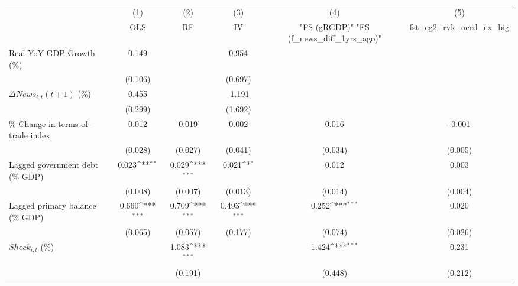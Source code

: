{
\def\sym#1{\ifmmode^{#1}\else\(^{#1}\)\fi}
\begin{tabular}{l*{5}{c}}
\toprule
                    &\multicolumn{1}{c}{(1)}&\multicolumn{1}{c}{(2)}&\multicolumn{1}{c}{(3)}&\multicolumn{1}{c}{(4)}&\multicolumn{1}{c}{(5)}\\
                    &\multicolumn{1}{c}{OLS}&\multicolumn{1}{c}{RF}&\multicolumn{1}{c}{IV}&\multicolumn{1}{c}{ "FS (gRGDP)"  "FS (f_news_diff_1yrs_ago)" }&\multicolumn{1}{c}{fst_eg2_rvk_oecd_ex_big}\\
\midrule
Real YoY GDP Growth (\%)&       0.149         &                     &       0.954         &                     &                     \\
                    &     (0.106)         &                     &     (0.697)         &                     &                     \\
\addlinespace
$ \Delta News_{i,t}(t+1)$ (\%)&       0.455         &                     &      -1.191         &                     &                     \\
                    &     (0.299)         &                     &     (1.692)         &                     &                     \\
\addlinespace
\% Change in terms-of-trade index&       0.012         &       0.019         &       0.002         &       0.016         &      -0.001         \\
                    &     (0.028)         &     (0.027)         &     (0.041)         &     (0.034)         &     (0.005)         \\
\addlinespace
Lagged government debt (\% GDP)&       0.023\sym{**} &       0.029\sym{***}&       0.021\sym{*}  &       0.012         &       0.003         \\
                    &     (0.008)         &     (0.007)         &     (0.013)         &     (0.014)         &     (0.004)         \\
\addlinespace
Lagged primary balance (\% GDP)&       0.660\sym{***}&       0.709\sym{***}&       0.493\sym{***}&       0.252\sym{***}&       0.020         \\
                    &     (0.065)         &     (0.057)         &     (0.177)         &     (0.074)         &     (0.026)         \\
\addlinespace
$ Shock_{i,t}$ (\%) &                     &       1.083\sym{***}&                     &       1.424\sym{***}&       0.231         \\
                    &                     &     (0.191)         &                     &     (0.448)         &     (0.212)         \\

\end{tabular}}
